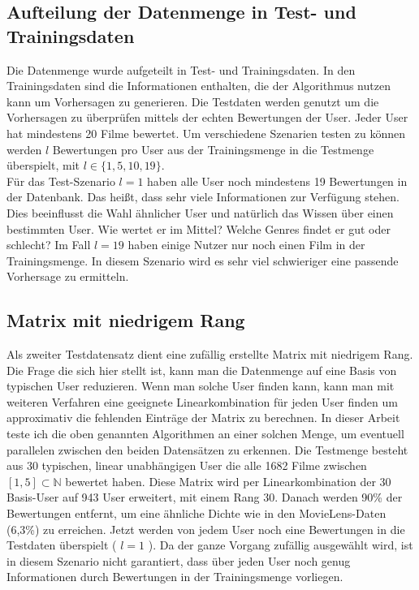 \subsection{Aufteilung der Datenmenge in Test- und Trainingsdaten}\label{s.split}
Die Datenmenge wurde aufgeteilt in Test- und Trainingsdaten. In den Trainingsdaten sind die Informationen enthalten, die der Algorithmus nutzen kann um Vorhersagen zu generieren. Die Testdaten werden genutzt um die Vorhersagen zu überprüfen mittels der echten Bewertungen der User. Jeder User hat mindestens 20 Filme bewertet. Um verschiedene Szenarien testen zu können werden $l$ Bewertungen pro User aus der Trainingsmenge in die Testmenge überspielt, mit $l \in \{1,5,10,19\}$.\\
Für das Test-Szenario $l = 1$ haben alle User noch mindestens 19 Bewertungen in der Datenbank. Das heißt, dass sehr viele Informationen zur Verfügung stehen. Dies beeinflusst die Wahl ähnlicher User und natürlich das Wissen über einen bestimmten User. Wie wertet er im Mittel? Welche Genres findet er gut oder schlecht? Im Fall $l = 19$ haben einige Nutzer nur noch einen Film in der Trainingsmenge. In diesem Szenario wird es sehr viel schwieriger eine passende Vorhersage zu ermitteln.
	
\subsection{Matrix mit niedrigem Rang}
Als zweiter Testdatensatz dient eine zufällig erstellte Matrix mit niedrigem Rang. Die Frage die sich hier stellt ist, kann man die Datenmenge auf eine Basis von typischen User reduzieren. Wenn man solche User finden kann, kann man mit weiteren Verfahren eine geeignete Linearkombination für jeden User finden um approximativ die fehlenden Einträge der Matrix zu berechnen. In dieser Arbeit teste ich die oben genannten Algorithmen an einer solchen Menge, um eventuell parallelen zwischen den beiden Datensätzen zu erkennen. Die Testmenge besteht aus 30 typischen, linear unabhängigen User die alle 1682 Filme zwischen $[1,5]\subset \mathbb{N}$ bewertet haben. Diese Matrix wird per Linearkombination der 30 Basis-User auf 943 User erweitert, mit einem Rang 30. Danach werden 90\% der Bewertungen entfernt, um eine ähnliche Dichte wie in den MovieLens-Daten (6,3\%) zu erreichen. Jetzt werden von jedem User noch eine Bewertungen in die Testdaten überspielt ( $l = 1$ ). Da der ganze Vorgang zufällig ausgewählt wird, ist in diesem Szenario nicht garantiert, dass über jeden User noch genug Informationen durch Bewertungen in der Trainingsmenge vorliegen.

